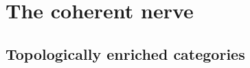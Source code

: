 \documentclass[main.tex]{subfiles}
\begin{document}
\section{The coherent nerve}
\label{sec:the_coherent_nerve}

%
%
%
%

\subsection{Topologically enriched categories}
\label{ssc:topologically_enriched_categories}
\end{document}
